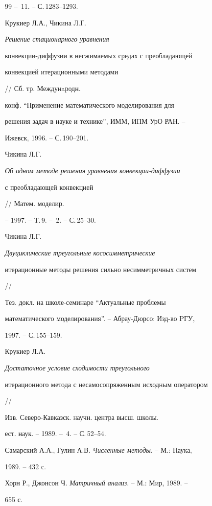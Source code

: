 \begin{thebibliography}{99}
-- \No\,11. -- С.\,1283--1293. 




Крукиер Л.А., Чикина Л.Г. {\em Решение стационарного уравнения  


конвекции-диффузии в несжимаемых средах с преобладающей  


конвекцией итерационными методами} // Сб. тр. Междунaродн.  


конф. ``Применение математического моделирования для  


решения задач в науке и технике'', ИММ, ИПМ УрО РАН. -- 


Ижевск, 1996. -- С.\,190--201. 




Чикина Л.Г. {\em Об одном методе решения уравнения конвекции-диффузии  


с преобладающей конвекцией} // Матем. моделир. 


-- 1997. -- Т.\,9. -- \No\,2. -- С.\,25--30. 




Чикина Л.Г. {\em Двуциклические треугольные кососимметрические  


итерационные методы решения сильно несимметричных систем} //  


Тез. докл. на школе-семинаре ``Актуальные проблемы  


математического моделирования''. -- Абрау-Дюрсо: Изд-во PГУ, 


1997. -- С.\,155--159. 




Крукиер Л.А. {\em Достаточное условие сходимости треугольного 


итерационного метода с несамосопряженным исходным оператором} //  


Изв. Северо-Кавказск. научн. центра высш. школы. 


ест. наук. -- 1989. -- \No\,4. -- С.\,52--54. 




Самарский А.А., Гулин А.В. {\em Численные методы}. -- М.: Наука,  


1989. -- 432 с. 




Хорн Р., Джонсон Ч. {\em Матричный анализ}. -- М.: Мир, 1989. -- 


655 с. 


 


\end{thebibliography} 


 


\vskip 2cm 


 






 


\label{end} 


 


